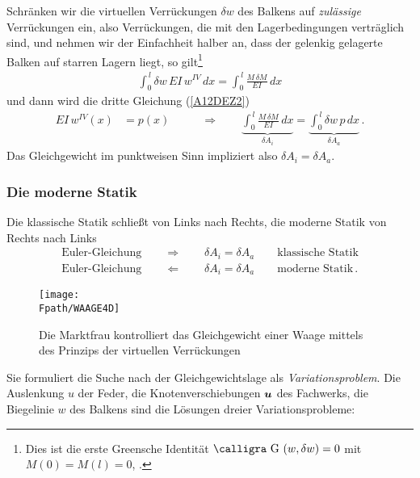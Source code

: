 Schr\"{a}nken wir die virtuellen Verr\"{u}ckungen $\delta w$ des Balkens auf {\em zul\"{a}ssige\/} Verr\"{u}ckungen ein, also Verr\"{u}ckungen, die mit den Lagerbedingungen vertr\"{a}glich sind, und nehmen wir der Einfachheit halber an, dass der gelenkig gelagerte Balken auf starren Lagern liegt, so gilt\footnote{Dies ist die erste Greensche Identit\"{a}t $\text{\normalfont\calligra G\,\,}(w, \delta w) = 0$ mit $M(0) = M(l) = 0$, \cite{HaJa2}.}
\begin{align}
\int_0^{\,l} \delta w\,EI\,w^{IV}\,dx = \int_0^{\,l} \frac{M\,\delta M}{EI}\,dx
\end{align}
und dann wird die dritte Gleichung (\ref{A12DEZ2})
\begin{align}
EI\,w^{IV}(x) &= p(x)\qquad &\Rightarrow \qquad \underbrace{\int_0^{\,l} \frac{M\,\delta
M}{EI}\,dx}_{\delta A_i} = \underbrace{\int_0^{\,l} \delta w\,p\,dx}_{\delta A_a}\,.
\end{align}
Das Gleichgewicht im punktweisen Sinn impliziert also $\delta A_i = \delta A_a$.

{\textcolor{sectionTitleBlue}{\subsubsection*{Die moderne Statik}}}
Die klassische Statik schlie{\ss}t von Links nach Rechts, die moderne Statik von Rechts nach
Links
\begin{align}
\mbox{Euler-Gleichung} \qquad \Rightarrow \qquad \delta A_i = \delta A_a
\qquad\mbox{klassische
Statik}\\
\mbox{Euler-Gleichung} \qquad \Leftarrow \qquad \delta A_i = \delta A_a
\qquad\mbox{moderne Statik}\,.
\end{align}
\begin{figure}[tbp] \centering
\centering
\if {} \sidecaption \fi
\texttt{[image: \\Fpath/WAAGE4D]}
\caption{Die Marktfrau kontrolliert das Gleichgewicht einer Waage mittels des Prinzips
der virtuellen Verr\"{u}ckungen} \label{Waage}
\end{figure}%
Sie formuliert die Suche nach der Gleichgewichtslage als {\em Variationsproblem\/}. Die Auslenkung $u$ der Feder, die Knotenverschiebungen $\mbox{\boldmath $u$}$ des Fachwerks, die Biegelinie $w$ des Balkens sind die L\"{o}sungen dreier Variationsprobleme: \\

